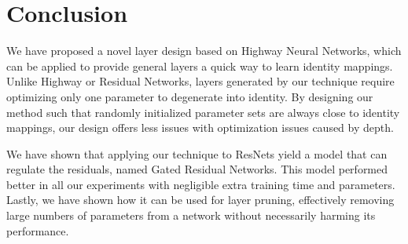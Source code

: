 \documentclass{article} \RequirePackage{amsmath,amsthm,amsfonts,amssymb}
\begin{document}
\section{Conclusion}

We have proposed a novel layer design based on Highway Neural Networks, which can be applied to provide general layers a quick way to learn identity mappings. Unlike Highway or Residual Networks, layers generated by our technique require optimizing only one parameter to degenerate into identity. By designing our method such that randomly initialized parameter sets are always close to identity mappings, our design offers less issues with optimization issues caused by depth.

We have shown that applying our technique to ResNets yield a model that can regulate the residuals, named Gated Residual Networks. This model performed better in all our experiments with negligible extra training time and parameters. Lastly, we have shown how it can be used for layer pruning, effectively removing large numbers of parameters from a network without necessarily harming its performance.









\end{document}
